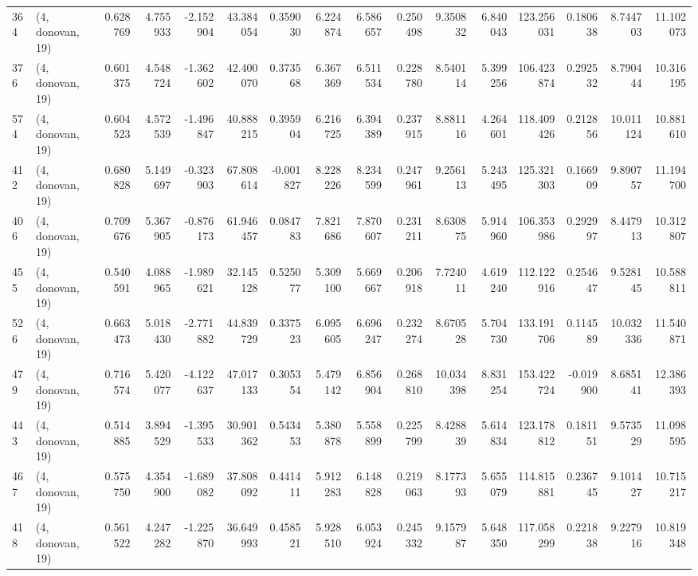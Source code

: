 \begin{tabular}{llrrrrrrrrrrrrrr}
364 &  (4, donovan, 19) &   0.628769 &   4.755933 &  -2.152904 &    43.384054 &   0.359030 &   6.224874 &   6.586657 &  0.250498 &   9.350832 &   6.840043 &    123.256031 &   0.180638 &    8.744703 &   11.102073 \\
376 &  (4, donovan, 19) &   0.601375 &   4.548724 &  -1.362602 &    42.400070 &   0.373568 &   6.367369 &   6.511534 &  0.228780 &   8.540114 &   5.399256 &    106.423874 &   0.292532 &    8.790444 &   10.316195 \\
574 &  (4, donovan, 19) &   0.604523 &   4.572539 &  -1.496847 &    40.888215 &   0.395904 &   6.216725 &   6.394389 &  0.237915 &   8.881116 &   4.264601 &    118.409426 &   0.212856 &   10.011124 &   10.881610 \\
412 &  (4, donovan, 19) &   0.680828 &   5.149697 &  -0.323903 &    67.808614 &  -0.001827 &   8.228226 &   8.234599 &  0.247961 &   9.256113 &   5.243495 &    125.321303 &   0.166909 &    9.890757 &   11.194700 \\
406 &  (4, donovan, 19) &   0.709676 &   5.367905 &  -0.876173 &    61.946457 &   0.084783 &   7.821686 &   7.870607 &  0.231211 &   8.630875 &   5.914960 &    106.353986 &   0.292997 &    8.447913 &   10.312807 \\
455 &  (4, donovan, 19) &   0.540591 &   4.088965 &  -1.989621 &    32.145128 &   0.525077 &   5.309100 &   5.669667 &  0.206918 &   7.724011 &   4.619240 &    112.122916 &   0.254647 &    9.528145 &   10.588811 \\
526 &  (4, donovan, 19) &   0.663473 &   5.018430 &  -2.771882 &    44.839729 &   0.337523 &   6.095605 &   6.696247 &  0.232274 &   8.670528 &   5.704730 &    133.191706 &   0.114589 &   10.032336 &   11.540871 \\
479 &  (4, donovan, 19) &   0.716574 &   5.420077 &  -4.122637 &    47.017133 &   0.305354 &   5.479142 &   6.856904 &  0.268810 &  10.034398 &   8.831254 &    153.422724 &  -0.019900 &    8.685141 &   12.386393 \\
443 &  (4, donovan, 19) &   0.514885 &   3.894529 &  -1.395533 &    30.901362 &   0.543453 &   5.380878 &   5.558899 &  0.225799 &   8.428839 &   5.614834 &    123.178812 &   0.181151 &    9.573529 &   11.098595 \\
467 &  (4, donovan, 19) &   0.575750 &   4.354900 &  -1.689082 &    37.808092 &   0.441411 &   5.912283 &   6.148828 &  0.219063 &   8.177393 &   5.655079 &    114.815881 &   0.236745 &    9.101427 &   10.715217 \\
418 &  (4, donovan, 19) &   0.561522 &   4.247282 &  -1.225870 &    36.649993 &   0.458521 &   5.928510 &   6.053924 &  0.245332 &   9.157987 &   5.648350 &    117.058299 &   0.221838 &    9.227916 &   10.819348 \\

\end{tabular}
